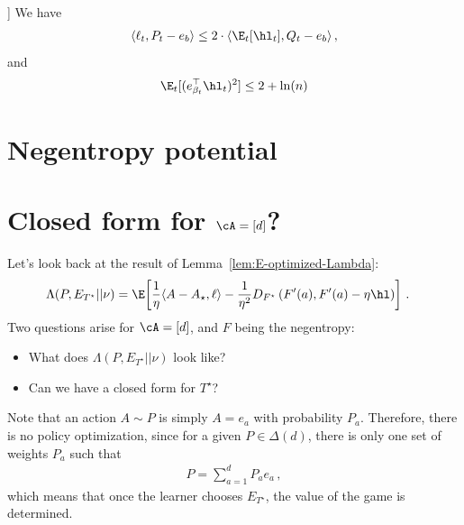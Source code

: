 \begin{lemma}[\cite{lattimore2024bandit}[Lemma 8.3]]
    We have
    \begin{align*}
        \langle \ell_t, P_t - e_{b} \rangle
        \leq 2 \cdot \langle \E_t[\hl_t], Q_t - e_{b} \rangle\,,
    \end{align*}
    and
    \begin{align*}
        \E_t[(e_{\beta_t}^\top \hl_t)^2]
        \leq 2 + \ln(n)
    \end{align*}
\end{lemma}

\hrulefill
\section{Negentropy potential}

\section{Closed form for $\cA = [d]$?}
Let's look back at the result of Lemma~\ref{lem:E-optimized-Lambda}:
\begin{align*}
    \Lambda(P, E_{T^\star} || \nu)
     & =
    \E\!\left[
        \frac{1}{\eta}
        \langle A - A_\star, \ell\rangle
        -
        \frac{1}{\eta^2}
        D_{F^\star}\left(F'(a), F'(a) - \eta \hl\right)
        \right]\,.
\end{align*}
Two questions arise for $\cA = [d]$, and $F$ being the negentropy:
\begin{itemize}
    \item What does $\Lambda(P, E_{T^\star} || \nu)$ look like?
    \item Can we have a closed form for $T^\star$?
\end{itemize}
Note that an action $A \sim P$ is simply $A = e_a$ with probability $P_a$.
Therefore, there is no policy optimization, since for a given $P \in \Delta(d)$,
there is only one set of weights $P_a$ such that
\begin{align*}
    P = \sum_{a=1}^d P_a e_a\,,
\end{align*}
which means that once the learner chooses $E_{T^\star}$, the value of the game is determined.

